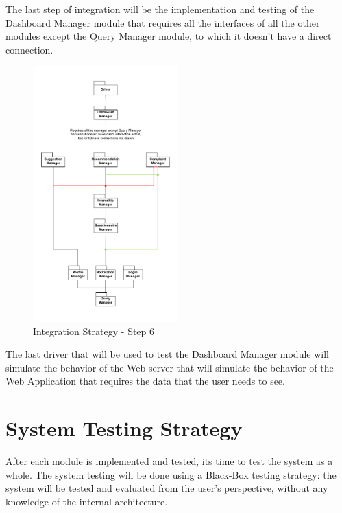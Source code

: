 \par The last step of integration will be the implementation and testing of the Dashboard Manager module that requires
all the interfaces of all the other modules except the Query Manager module, to which it doesn't have a direct connection.

\begin{figure}[H]
    \centering
    \includegraphics[width=0.5\textwidth]{Images/Integ_6.pdf}
    \caption{Integration Strategy - Step 6}
    \label{fig:integration-strategy-step-6}
\end{figure}

\par The last driver that will be used to test the Dashboard Manager module will simulate the behavior of the Web server
that will simulate the behavior of the Web Application that requires the data that the user needs to see.

\section{System Testing Strategy}

\par After each module is implemented and tested, its time to test the system as a whole. The system testing will be 
done using a Black-Box testing strategy: the system will be tested and evaluated from the user's perspective, without 
any knowledge of the internal architecture.

